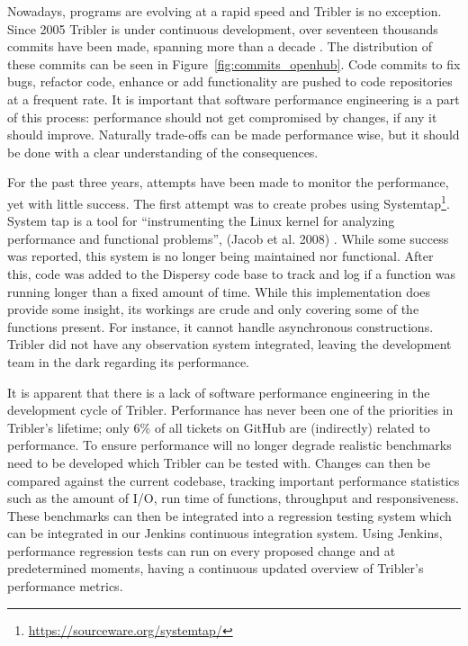 Nowadays, programs are evolving at a rapid speed and Tribler is no exception. 
Since 2005 Tribler is under continuous development, over seventeen thousands commits have been made, spanning more than a decade \cite{openhub2016tribler}.
The distribution of these commits can be seen in Figure~\ref{fig:commits_openhub}.
Code commits to fix bugs, refactor code, enhance or add functionality are pushed to code repositories at a frequent rate.
It is important that software performance engineering is a part of this process: performance should not get compromised by changes, if any it should improve.
Naturally trade-offs can be made performance wise, but it should be done with a clear understanding of the consequences.

For the past three years, attempts have been made to monitor the performance, yet with little success.
The first attempt was to create probes using Systemtap\footnote{\url{https://sourceware.org/systemtap/}}.
System tap is a tool for \enquote{instrumenting the Linux kernel for analyzing performance and functional problems}, (Jacob et al. 2008) \cite{jacob2008systemtap}.
While some success was reported, this system is no longer being maintained nor functional.
After this, code was added to the Dispersy code base to track and log if a function was running longer than a fixed amount of time.
While this implementation does provide some insight, its workings are crude and only covering some of the functions present.
For instance, it cannot handle asynchronous constructions.
Tribler did not have any observation system integrated, leaving the development team in the dark regarding its performance.

It is apparent that there is a lack of software performance engineering in the development cycle of Tribler.
Performance has never been one of the priorities in Tribler's lifetime; only 6\% of all tickets on GitHub are (indirectly) related to performance.
To ensure performance will no longer degrade realistic benchmarks need to be developed which Tribler can be tested with.
Changes can then be compared against the current codebase, tracking important performance statistics such as the amount of I/O, run time of functions, throughput and responsiveness.
These benchmarks can then be integrated into a regression testing system which can be integrated in our Jenkins continuous integration system.
Using Jenkins, performance regression tests can run on every proposed change and at predetermined moments, having a continuous updated overview of Tribler's performance metrics.

